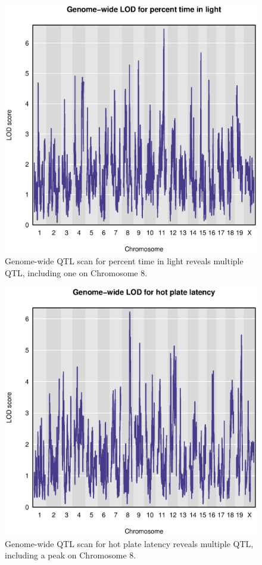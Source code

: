 \documentclass[12pt,twoside, lineno]{gsajnl}
\begin{document}
\begin{figure}
\includegraphics{../Rmd/genomewide_lod_trait10.eps}
\caption{Genome-wide QTL scan for percent time in light reveals
  multiple QTL, including one on Chromosome 8.}
\label{fig:genomewide10}
\end{figure}

\clearpage

\begin{figure}
\includegraphics{../Rmd/genomewide_lod_trait22.eps}
\caption{Genome-wide QTL scan for hot plate latency reveals multiple
  QTL, including a peak on Chromosome 8.}
\label{fig:genomewide22}
\end{figure}
\end{document}
